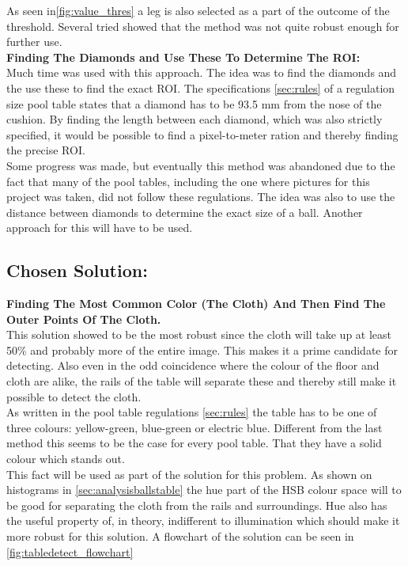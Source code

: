 As seen in\ref{fig:value_thres} a leg is also selected as a part of the outcome of the threshold. Several tried showed that the method was not quite robust enough for further use.\\

\textbf{Finding The Diamonds and Use These To Determine The ROI:}\\
Much time was used with this approach. The idea was to find the diamonds and the use these to find the exact ROI. The specifications \ref{sec:rules} of a regulation size pool table states that a diamond has to be 93.5 mm from the nose of the cushion. By finding the length between each diamond, which was also strictly specified, it would be possible to find a pixel-to-meter ration and thereby finding the precise ROI.\\

Some progress was made, but eventually this method was abandoned due to the fact that many of the pool tables, including the one where pictures for this  project was taken, did not follow these regulations. The idea was also to use the distance between diamonds to determine the exact size of a ball. Another approach for this will have to be used.\\

\subsection{Chosen Solution:}

\textbf{Finding The Most Common Color (The Cloth) And Then Find The Outer Points Of The Cloth.}\\
This solution showed to be the most robust since the cloth will take up at least 50\% and probably more of the entire image. This makes it a prime candidate for detecting. Also even in the odd coincidence where the colour of the floor and cloth are alike, the rails of the table will separate these and thereby still make it possible to detect the cloth.\\

As written in the pool table regulations \ref{sec:rules} the table has to be one of three colours: yellow-green, blue-green or electric blue. Different from the last method this seems to be the case for every pool table. That they have a solid colour which stands out.\\

This fact will be used as part of the solution for this problem. As shown on histograms in \ref{sec:analysisballstable} the hue part of the HSB colour space will to be good for separating the cloth from the rails and surroundings. Hue also has the useful property of, in theory, indifferent to illumination which should make it more robust for this solution. A flowchart of the solution can be seen in \ref{fig:tabledetect_flowchart}


